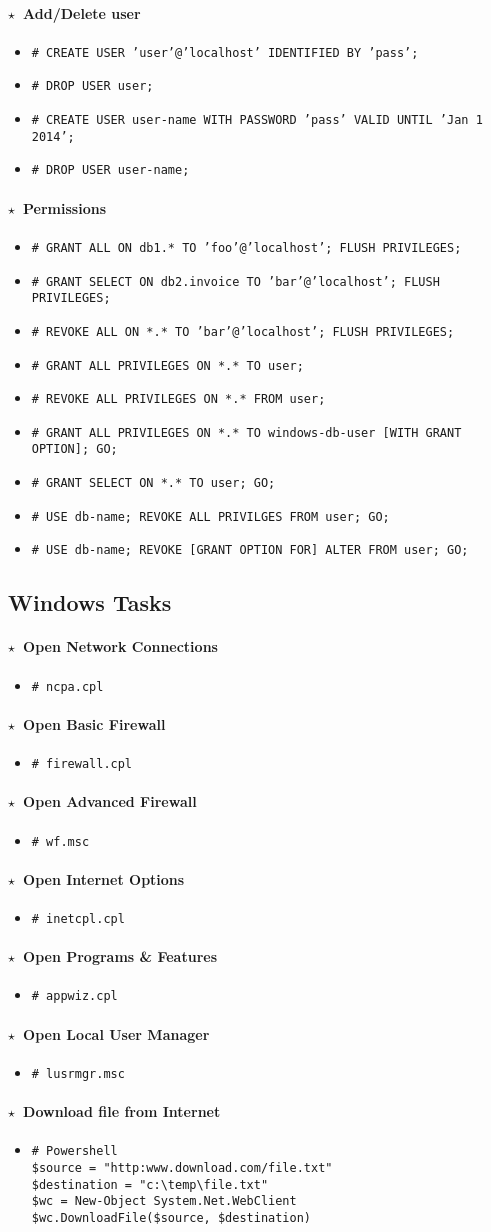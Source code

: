 \documentclass[10pt,landscape]{article}
\newcommand{\os}[1]{\texttt{\footnotesize{#1}}}
\newcommand{\windows}{\os{W}}
\newenvironment{action}[1]
  {\paragraph{$\star$~#1}\begin{itemize}[leftmargin=1cm]}
  {\end{itemize}}
\newcommand{\cmd}[2]{\item[#1] {\small\tt\# #2}}
\begin{document}
\begin{multicols*}{3}
\begin{action}{Add/Delete user}
\cmd{\mysql}{CREATE USER 'user'@'localhost' IDENTIFIED BY 'pass';}
\cmd{\mysql}{DROP USER user;}
\cmd{\postgres}{CREATE USER user-name WITH PASSWORD 'pass' VALID UNTIL 'Jan 1 2014';}
\cmd{\postgres}{DROP USER user-name;}
\end{action}

\begin{action}{Permissions}
\cmd{\mysql}{GRANT ALL ON db1.* TO 'foo'@'localhost'; FLUSH PRIVILEGES;}
\cmd{\mysql}{GRANT SELECT ON db2.invoice TO 'bar'@'localhost'; FLUSH PRIVILEGES;}
\cmd{\mysql}{REVOKE ALL ON *.* TO 'bar'@'localhost'; FLUSH PRIVILEGES;}
\cmd{\postgres}{GRANT ALL PRIVILEGES ON *.* TO user;}
\cmd{\postgres}{REVOKE ALL PRIVILEGES ON *.* FROM user;}
\cmd{\mssql}{GRANT ALL PRIVILEGES ON *.* TO windows-db-user [WITH GRANT OPTION]; GO;}
\cmd{\mssql}{GRANT SELECT ON *.* TO user; GO;}
\cmd{\mssql}{USE db-name; REVOKE ALL PRIVILGES FROM user; GO;}
\cmd{\mssql}{USE db-name; REVOKE [GRANT OPTION FOR] ALTER FROM user; GO;}
\end{action}

\subsection*{Windows Tasks}

\begin{action}{Open Network Connections}
\cmd{\windows}{ncpa.cpl}
\end{action}

\begin{action}{Open Basic Firewall}
\cmd{\windows}{firewall.cpl}
\end{action}

\begin{action}{Open Advanced Firewall}
\cmd{\windows}{wf.msc}
\end{action}

\begin{action}{Open Internet Options}
\cmd{\windows}{inetcpl.cpl}
\end{action}

\begin{action}{Open Programs \& Features}
\cmd{\windows}{appwiz.cpl}
\end{action}

\begin{action}{Open Local User Manager}
\cmd{\windows}{lusrmgr.msc}
\end{action}

\begin{action}{Download file from Internet}
\cmd{\windows}{
Powershell \\
\$source = "http:www.download.com/file.txt" \\
\$destination = "c:\textbackslash temp\textbackslash file.txt" \\
\$wc = New-Object System.Net.WebClient \\
\$wc.DownloadFile(\$source, \$destination)}
\end{action}


\end{multicols*}
\end{document}
